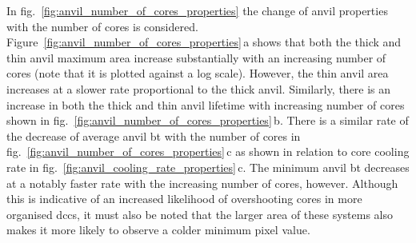 In fig.~\ref{fig:anvil_number_of_cores_properties} the change of anvil properties with the number of cores is considered.
Figure~\ref{fig:anvil_number_of_cores_properties}\,a shows that both the thick and thin anvil maximum area increase substantially with an increasing number of cores (note that it is plotted against a log scale).
However, the thin anvil area increases at a slower rate proportional to the thick anvil.
Similarly, there is an increase in both the thick and thin anvil lifetime with increasing number of cores shown in fig.~\ref{fig:anvil_number_of_cores_properties}\,b.
There is a similar rate of the decrease of average anvil \acrshort{bt} with the number of cores in fig.~\ref{fig:anvil_number_of_cores_properties}\,c as shown in relation to core cooling rate in fig.~\ref{fig:anvil_cooling_rate_properties}\,c.
The minimum anvil \acrshort{bt} decreases at a notably faster rate with the increasing number of cores, however.
Although this is indicative of an increased likelihood of overshooting cores in more organised \acrshort{dcc}s, it must also be noted that the larger area of these systems also makes it more likely to observe a colder minimum pixel value.

